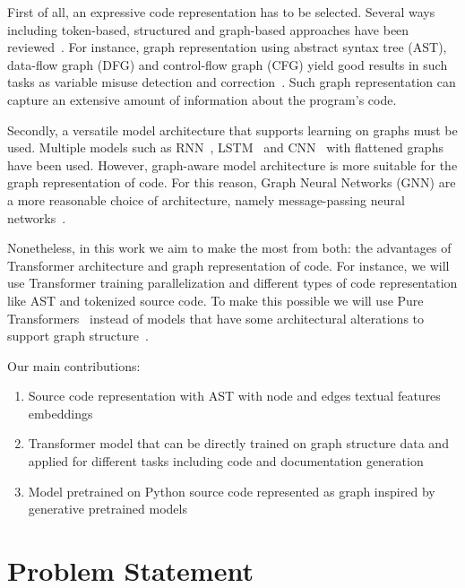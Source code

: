 \documentclass[sigplan,screen,anonymous,natbib=false]{acmart}
\begin{document}
First of all, an expressive code representation has to be selected. 
Several ways including token-based, structured and graph-based approaches have been reviewed~\cite{sm_avdoshin_code_2022}.
For instance, graph representation using abstract syntax tree (AST), data-flow graph (DFG) and control-flow graph (CFG) 
yield good results in such tasks as variable misuse detection and correction~\cite{allamanis_learning_2017}.
Such graph representation can capture an extensive amount of information about the program’s code.

Secondly, a versatile model architecture that supports learning on graphs must be used. 
Multiple models such as RNN~\cite{white_deep_2016}, LSTM~\cite{wei_supervised_2017} and CNN~\cite{mou_convolutional_2016} with flattened graphs have been used.
However, graph-aware model architecture is more suitable for the graph representation of code. 
For this reason, Graph Neural Networks (GNN) are a more reasonable choice of architecture, 
namely message-passing neural networks~\cite{allamanis_learning_2017}.

Nonetheless, in this work we aim to make the most from both: the advantages of Transformer architecture and graph representation of code. 
For instance, we will use Transformer training parallelization and different types of code representation like AST and tokenized source code.
To make this possible we will use Pure Transformers~\cite{kim_pure_2022} instead of models that have some architectural alterations to support graph structure~\cite{kreuzer_rethinking_2021,dwivedi_generalization_2021,ying_transformers_2021}.

Our main contributions:
\begin{enumerate}
    \item Source code representation with AST with node and edges textual features embeddings
    \item Transformer model that can be directly trained on graph structure data and applied for different tasks including code and documentation generation
    \item Model pretrained on Python source code represented as graph inspired by generative pretrained models~\cite{radford_language_2019,brown_language_2020}
\end{enumerate}

\section{Problem Statement}\label{sec:problem-statement}
\end{document}
